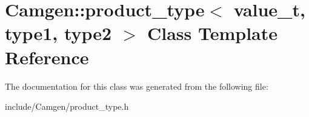 \hypertarget{a00440}{}\section{Camgen\+:\+:product\+\_\+type$<$ value\+\_\+t, type1, type2 $>$ Class Template Reference}
\label{a00440}


The documentation for this class was generated from the following file\+:\begin{DoxyCompactItemize}
\item 
include/\+Camgen/product\+\_\+type.\+h\end{DoxyCompactItemize}
